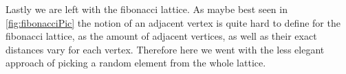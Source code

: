 Lastly we are left with the fibonacci lattice. As maybe best seen in \ref{fig:fibonacciPic} the notion of an adjacent vertex is quite hard to define for the fibonacci lattice, as the amount of adjacent vertices, as well as their exact distances vary for each vertex. Therefore here we went with the less elegant approach of picking a random element from the whole lattice.





